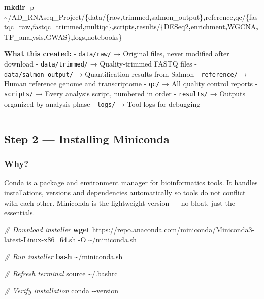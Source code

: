 \documentclass[
]{article}
\newenvironment{Shaded}{\begin{snugshade}}{\end{snugshade}}
\newcommand{\AttributeTok}[1]{\textcolor[rgb]{0.13,0.29,0.53}{#1}}
\newcommand{\BuiltInTok}[1]{#1}
\newcommand{\CommentTok}[1]{\textcolor[rgb]{0.56,0.35,0.01}{\textit{#1}}}
\newcommand{\DataTypeTok}[1]{\textcolor[rgb]{0.13,0.29,0.53}{#1}}
\newcommand{\ExtensionTok}[1]{#1}
\newcommand{\FunctionTok}[1]{\textcolor[rgb]{0.13,0.29,0.53}{\textbf{#1}}}
\newcommand{\NormalTok}[1]{#1}
\newcommand{\OperatorTok}[1]{\textcolor[rgb]{0.81,0.36,0.00}{\textbf{#1}}}
\begin{document}
\begin{Shaded}
\begin{Highlighting}[]
\FunctionTok{mkdir} \AttributeTok{{-}p}\NormalTok{ \textasciitilde{}/AD\_RNAseq\_Project/}\DataTypeTok{\{data/\{raw}\OperatorTok{,}\DataTypeTok{trimmed}\OperatorTok{,}\DataTypeTok{salmon\_output\}}\OperatorTok{,}\DataTypeTok{reference}\OperatorTok{,}\DataTypeTok{qc/\{fastqc\_raw}\OperatorTok{,}\DataTypeTok{fastqc\_trimmed}\OperatorTok{,}\DataTypeTok{multiqc\}}\OperatorTok{,}\DataTypeTok{scripts}\OperatorTok{,}\DataTypeTok{results/\{DESeq2}\OperatorTok{,}\DataTypeTok{enrichment}\OperatorTok{,}\DataTypeTok{WGCNA}\OperatorTok{,}\DataTypeTok{TF\_analysis}\OperatorTok{,}\DataTypeTok{GWAS\}}\OperatorTok{,}\DataTypeTok{logs}\OperatorTok{,}\DataTypeTok{notebooks\}}
\end{Highlighting}
\end{Shaded}

\textbf{What this created:} - \texttt{data/raw/} → Original files, never
modified after download - \texttt{data/trimmed/} → Quality-trimmed FASTQ
files - \texttt{data/salmon\_output/} → Quantification results from
Salmon - \texttt{reference/} → Human reference genome and transcriptome
- \texttt{qc/} → All quality control reports - \texttt{scripts/} → Every
analysis script, numbered in order - \texttt{results/} → Outputs
organized by analysis phase - \texttt{logs/} → Tool logs for debugging

\begin{center}\rule{0.5\linewidth}{0.5pt}\end{center}

\subsection{Step 2 --- Installing
Miniconda}\label{step-2-installing-miniconda}

\subsubsection{Why?}\label{why-1}

Conda is a package and environment manager for bioinformatics tools. It
handles installations, versions and dependencies automatically so tools
do not conflict with each other. Miniconda is the lightweight version
--- no bloat, just the essentials.

\begin{Shaded}
\begin{Highlighting}[]
\CommentTok{\# Download installer}
\FunctionTok{wget}\NormalTok{ https://repo.anaconda.com/miniconda/Miniconda3{-}latest{-}Linux{-}x86\_64.sh }\AttributeTok{{-}O}\NormalTok{ \textasciitilde{}/miniconda.sh}

\CommentTok{\# Run installer}
\FunctionTok{bash}\NormalTok{ \textasciitilde{}/miniconda.sh}

\CommentTok{\# Refresh terminal}
\BuiltInTok{source}\NormalTok{ \textasciitilde{}/.bashrc}

\CommentTok{\# Verify installation}
\ExtensionTok{conda} \AttributeTok{{-}{-}version}
\end{Highlighting}
\end{Shaded}
\end{document}
